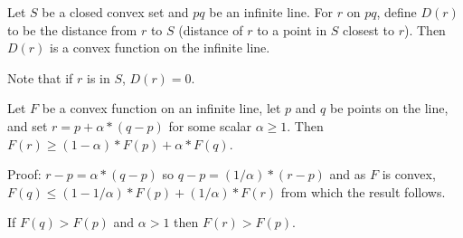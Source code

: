 \documentclass[12pt]{article}
\begin{document}
\begin{lemma}
Let $S$ be a closed convex set and $pq$ be an infinite line.  For $r$ on $pq$,
define $D(r)$ to be the distance from $r$ to $S$ (distance of
$r$ to a point in $S$ closest to $r$).  Then $D(r)$ is a convex
function on the infinite line.
\end{lemma}

Note that if $r$ is in $S$, $D(r) = 0$.

\begin{lemma}
Let $F$ be a convex function on an infinite line,
let $p$ and $q$ be points on the line, and set $r=p+\alpha*(q-p)$
for some scalar $\alpha\ge 1$.  Then $F(r)\ge(1-\alpha)*F(p)+\alpha*F(q)$.
\end{lemma}
\begin{indpar}{0.2in}
Proof: $r-p = \alpha*(q-p)$ so $q-p=(1/\alpha)*(r-p)$ and as $F$ is convex,
$F(q)\le(1-1/\alpha)*F(p)+(1/\alpha)*F(r)$ from which the result
follows.
\end{indpar}

\begin{corollary}\label{CONVEX-EXTENSION}
If $F(q)> F(p)$ and $\alpha>1$ then $F(r)> F(p)$.
\end{corollary}
\end{document}
